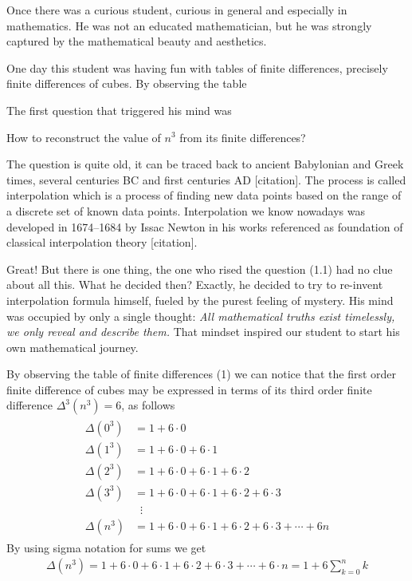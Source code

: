 Once there was a curious student, curious in general and especially in mathematics.
He was not an educated mathematician, but he was strongly captured by the mathematical
beauty and aesthetics.

One day this student was having fun with tables of finite differences, precisely finite differences of cubes.
By observing the table

The first question that triggered his mind was
\begin{question}
    How to reconstruct the value of $n^3$ from its finite differences?
\end{question}
The question is quite old, it can be traced back to ancient Babylonian and Greek times,
several centuries BC and first centuries AD [citation].
The process is called interpolation which is a process
of finding new data points based on the range of a discrete set
of known data points.
Interpolation we know nowadays was developed in 1674--1684 by Issac Newton
in his works referenced as foundation of classical interpolation theory [citation].

Great!
But there is one thing, the one who rised the question (1.1) had no clue about all this.
What he decided then?
Exactly, he decided to try to re-invent interpolation formula himself,
fueled by the purest feeling of mystery.
His mind was occupied by only a single thought:
\textit{
    All mathematical truths exist timelessly, we only reveal and describe them.
}
That mindset inspired our student to start his own mathematical journey.

By observing the table of finite differences (1) we can notice that
the first order finite difference of cubes may be expressed in terms of its
third order finite difference $\Delta^3(n^3) = 6$, as follows
\begin{align*}
    \begin{split}
        \Delta(0^3) &= 1+6 \cdot 0 \\
        \Delta(1^3) &= 1+6\cdot0+6\cdot1 \\
        \Delta(2^3) &= 1+6\cdot0+6\cdot1+6\cdot2 \\
        \Delta(3^3) &= 1+6\cdot0+6\cdot1+6\cdot2+6\cdot3 \\
        &\; \; \vdots \\
        \Delta(n^3) &= 1+6\cdot0+6\cdot1+6\cdot2+6\cdot3 + \cdots + 6n
    \end{split}
\end{align*}
By using sigma notation for sums we get
\begin{align*}
    \Delta(n^3) = 1+6\cdot0+6\cdot1+6\cdot2+6\cdot3+\cdots+6\cdot n = 1 + 6 \sum_{k=0}^{n} k
\end{align*}

